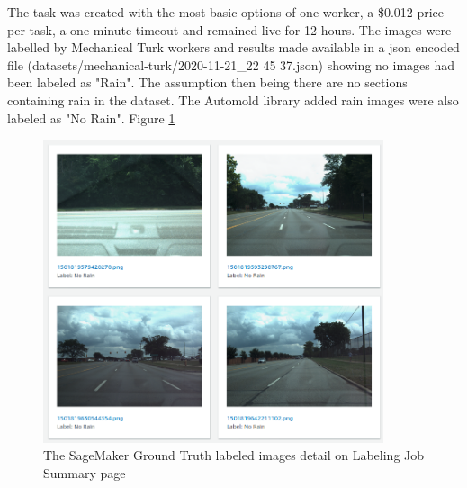 The task was created with the most basic options of one worker, a \$0.012 price per task, a one minute timeout and remained live for 12 hours. 
The images were labelled by Mechanical Turk workers and results made available in a json encoded file (datasets/mechanical-turk/2020-11-21\_22 45 37.json) showing no images had been labeled as "Rain". The assumption then being there are no sections containing rain in the dataset. The Automold library added rain images were also labeled as "No Rain". Figure \ref{fig:MechTurkLabeledImages}
\begin{figure}[h!]
\centering
\includegraphics[width=10cm]{Figures/MechTurkLabeledImages.png}
\caption{The SageMaker Ground Truth labeled images detail on Labeling Job Summary page}
\label{fig:MechTurkLabeledImages}
\end{figure}

